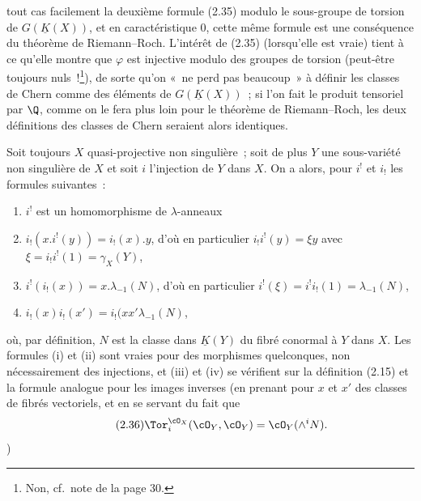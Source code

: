 tout cas facilement la deuxième formule (2.35) modulo le sous-groupe de torsion de $G(\underline K(X))$, et en caractéristique $0$, cette même formule est une conséquence du théorème de Riemann--Roch. L'intérêt de (2.35) (lorsqu'elle est vraie) tient à ce qu'elle montre que $\varphi$ est injective modulo des groupes de torsion (peut-être toujours nuls~!\footnote{Non, cf.\ note de la page 30.}), de sorte qu'on «~ne perd pas beaucoup~» à définir les classes de Chern comme des éléments de $G(\underline K(X))$~; si l'on fait le produit tensoriel par $\Q$, comme on le fera plus loin pour le théorème de Riemann--Roch, les deux définitions des classes de Chern seraient alors identiques.

Soit toujours $X$ quasi-projective non singulière~; soit de plus $Y$ une sous-variété non singulière de $X$ et soit $i$ l'injection de $Y$ dans $X$. On a alors, pour $i^!$ et $i_!$ les formules suivantes~:
\begin{enumerate}[label=(\roman*)]
\item $i^!$ est un homomorphisme de $\lambda$-anneaux
\item $i_!(x.i^!(y))=i_!(x).y$, d'où en particulier $i_!i^!(y)=\xi y$ avec $\xi=i_!i^!(1)=\gamma_X(Y)$,
\item $i^!(i_!(x))=x.\lambda_{-1}(N)$, d'où en particulier $i^!(\xi)=i^!i_!(1)=\lambda_{-1}(N)$,
\item $i_!(x)i_!(x')=i_!(xx'\lambda_{-1}(N)$,
\end{enumerate}
où, par définition, $N$ est la classe dans $\underline K(Y)$ du fibré conormal à $Y$ dans $X$. Les formules (i) et (ii) sont vraies pour des morphismes quelconques, non nécessairement des injections, et (iii) et (iv) se vérifient sur la définition (2.15) et la formule analogue pour les images inverses (en prenant pour $x$ et $x'$ des classes de fibrés vectoriels, et en se servant du fait que
\begin{equation}\tag{2.36}
 \Tor^{\cO_X}_i(\cO_Y,\cO_Y)=\cO_Y(\wedge^i N).
\end{equation}
)
